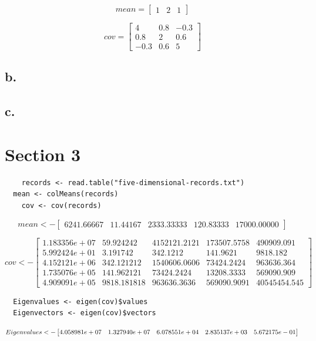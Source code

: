 \documentclass{report}
\begin{document}
\[
  mean=
  \begin{bmatrix}
    1 & 2 & 1
  \end{bmatrix}
\]

\[
  cov=
  \begin{bmatrix}
    4 & 0.8 & -0.3 \\
    0.8 & 2 & 0.6 \\
    -0.3 & 0.6 & 5
  \end{bmatrix}
\]

\section{b.}

\section{c.}

\chapter{Section 3}

\begin{verbatim}
	records <- read.table("five-dimensional-records.txt")
  mean <- colMeans(records)
	cov <- cov(records)
\end{verbatim}

\[
  mean <- 
  \begin{bmatrix}
    6241.66667 & 11.44167 & 2333.33333 & 120.83333 & 17000.00000
  \end{bmatrix}
\]

\[
  cov <- 
  \begin{bmatrix}
	1.183356e+07 & 59.924242 & 4152121.2121 & 173507.5758 & 490909.091 \\
	5.992424e+01 & 3.191742 & 342.1212 & 141.9621 & 9818.182 \\
	4.152121e+06 & 342.121212 & 1540606.0606 & 73424.2424 & 963636.364 \\
	1.735076e+05 & 141.962121 & 73424.2424 & 13208.3333 & 569090.909 \\
	4.909091e+05 & 9818.181818 & 963636.3636 & 569090.9091 & 40545454.545
  \end{bmatrix}
\]

\begin{verbatim}
  Eigenvalues <- eigen(cov)$values
  Eigenvectors <- eigen(cov)$vectors
\end{verbatim}

\[
  Eigenvalues <- 
  \begin{bmatrix}
	  4.058981e+07 & 1.327940e+07 & 6.078551e+04 & 2.835137e+03 & 5.672175e-01
  \end{bmatrix} \\
\]
\end{document}
